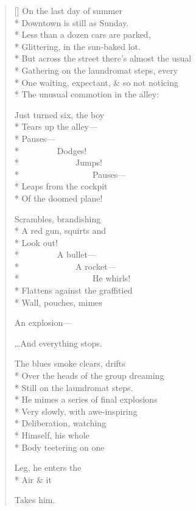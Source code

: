 \label{ch:noon}
\settowidth{\versewidth}{But across the street there's almost the usual}
\begin{verse}[\versewidth]
On the last day of summer\\*
Downtown is still as Sunday.\\*
Less than a dozen cars are parked,\\*
Glittering, in the sun-baked lot.\\*
But across the street there's almost the usual\\*
Gathering on the laundromat steps, every\\*
One waiting, expectant, \& so not noticing\\*
The unusual commotion in the alley:

Just turned six, the boy\\*
Tears up the alley---\\*
Pauses---\\*
          Dodges!\\*
               Jumps!\\*
                    Pauses---\\*
Leaps from the cockpit\\*
Of the doomed plane!

Scrambles, brandishing\\*
A red gun, squirts and\\*
Look out!\\*
          A bullet---\\*
               A rocket---\\*
                    He whirls!\\*
Flattens against the graffitied\\*
Wall, pouches, mimes

An explosion---

\ldots And everything stops.

The blues smoke clears, drifts\\*
Over the heads of the group dreaming\\*
Still on the laundromat steps.\\*
He mimes a series of final explosions\\*
Very slowly, with awe-inspiring\\*
Deliberation, watching\\*
Himself, his whole\\*
Body teetering on one

Leg, he enters the\\*
Air \& it

Takes him.
\end{verse}
